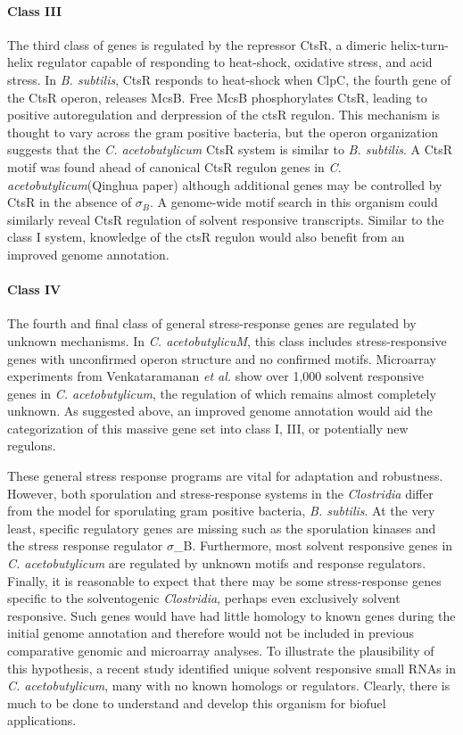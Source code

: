 \paragraph{Class III}
The third class of genes is regulated by the repressor CtsR, a dimeric helix-turn-helix regulator capable of responding to heat-shock, oxidative stress, and acid stress.\cite{136} In \textit{B. subtilis}, CtsR responds to heat-shock when ClpC, the fourth gene of the CtsR operon, releases McsB.\cite{140} Free McsB phosphorylates CtsR, leading to positive autoregulation and derpression of the ctsR regulon.\cite{137,138,140} This mechanism is thought to vary across the gram positive bacteria,\cite{137} but the operon organization suggests that the \textit{C. acetobutylicum} CtsR system is similar to \textit{B. subtilis}.\cite{42} A CtsR motif was found ahead of canonical CtsR regulon genes in \textit{C. acetobutylicum}(Qinghua paper) although additional genes may be controlled by CtsR in the absence of $\sigma_{B}$. A genome-wide motif search in this organism could similarly reveal CtsR regulation of solvent responsive transcripts. Similar to the class I system, knowledge of the ctsR regulon would also benefit from an improved genome annotation.

\paragraph{Class IV}
The fourth and final class of general stress-response genes are regulated by unknown mechanisms. In \textit{C. acetobutylicuM}, this class includes stress-responsive genes with unconfirmed operon structure and no confirmed motifs. Microarray experiments from Venkataramanan \textit{et al.} show over 1,000 solvent responsive genes in \textit{C. acetobutylicum}, the regulation of which remains almost completely unknown.\cite{42} As suggested above, an improved genome annotation would aid the categorization of this massive gene set into class I, III, or potentially new regulons.

These general stress response programs are vital for adaptation and robustness. However, both sporulation and stress-response systems in the \textit{Clostridia} differ from the model for sporulating gram positive bacteria, \textit{B. subtilis}.\cite{126} At the very least, specific regulatory genes are missing such as the sporulation kinases and the stress response regulator $\sigma$_B.\cite{126} Furthermore, most solvent responsive genes in \textit{C. acetobutylicum} are regulated by unknown motifs and response regulators.\cite{42} Finally, it is reasonable to expect that there may be some stress-response genes specific to the solventogenic \textit{Clostridia}, perhaps even exclusively solvent responsive. Such genes would have had little homology to known genes during the initial genome annotation and therefore would not be included in previous comparative genomic and microarray analyses.\cite{91,42} To illustrate the plausibility of this hypothesis, a recent study identified unique solvent responsive small RNAs in \textit{C. acetobutylicum}, many with no known homologs or regulators.\cite{39} Clearly, there is much to be done to understand and develop this organism for biofuel applications.

